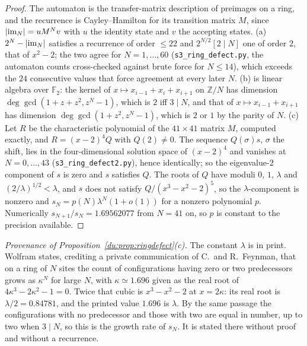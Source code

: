 \documentclass[11pt]{article}
\theoremstyle{definition}
\theoremstyle{remark}
\newcommand{\Z}{\mathbb{Z}}
\newcommand{\F}{\mathbb{F}_2}
\begin{document}
\begin{proof}
The automaton is the transfer-matrix description of preimages on a ring, and the recurrence is
Cayley--Hamilton for its transition matrix $M$, since $|{\rm im}_N|=uM^{N}v$ with $u$ the identity state
and $v$ the accepting states. (a) $2^{N}-|{\rm im}_N|$ satisfies a recurrence of order $\le22$ and
$2^{N/2}[2\mid N]$ one of order $2$, that of $x^{2}-2$; the two agree for $N=1,\dots,60$
(\texttt{s3\_ring\_defect.py}, the automaton counts cross-checked against brute force for $N\le14$),
which exceeds the $24$ consecutive values that force agreement at every later $N$. (b) is linear algebra
over $\F$: the kernel of $x\mapsto x_{i-1}+x_i+x_{i+1}$ on $\Z/N$ has dimension
$\deg\gcd(1+z+z^{2},z^{N}-1)$, which is $2$ iff $3\mid N$, and that of $x\mapsto x_{i-1}+x_{i+1}$ has
dimension $\deg\gcd(1+z^{2},z^{N}-1)$, which is $2$ or $1$ by the parity of $N$. (c) Let $R$ be the
characteristic polynomial of the $41\times41$ matrix $M$, computed exactly, and $R=(x-2)^{4}Q$ with
$Q(2)\ne0$. The sequence $Q(\sigma)s$, $\sigma$ the shift, lies in the four-dimensional solution space of
$(x-2)^{4}$ and vanishes at $N=0,\dots,43$ (\texttt{s3\_ring\_defect2.py}), hence identically; so the
eigenvalue-$2$ component of $s$ is zero and $s$ satisfies $Q$. The roots of $Q$ have moduli $0$, $1$,
$\lambda$ and $(2/\lambda)^{1/2}<\lambda$, and $s$ does not satisfy $Q/(x^{3}-x^{2}-2)^{5}$, so the
$\lambda$-component is nonzero and $s_N=p(N)\lambda^{N}(1+o(1))$ for a nonzero polynomial $p$.
Numerically $s_{N+1}/s_N=1.69562077$ from $N=41$ on, so $p$ is constant to the precision available.
\end{proof}

\noindent\emph{Provenance of Proposition~\ref{du:prop:ringdefect}(c).} The constant $\lambda$ is in print. Wolfram \cite[\S9]{W86} states, crediting a private communication of C.~and R.~Feynman, that on a ring of $N$ sites the count of configurations having zero or two predecessors grows as $\kappa^{N}$ for large $N$, with $\kappa\simeq1.696$ given as the real root of $4\kappa^{3}-2\kappa^{2}-1=0$. Twice that cubic is $x^{3}-x^{2}-2$ at $x=2\kappa$: its real root is $\lambda/2=0.84781$, and the printed value $1.696$ is $\lambda$. By the same passage the configurations with no predecessor and those with two are equal in number, up to two when $3\mid N$, so this is the growth rate of $s_N$. It is stated there without proof and without a recurrence.
\end{document}
